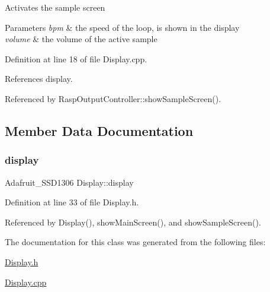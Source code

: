 Activates the sample screen 
\begin{DoxyParams}{Parameters}
{\em bpm} & the speed of the loop, is shown in the display \\
\hline
{\em volume} & the volume of the active sample \\
\hline
\end{DoxyParams}


Definition at line 18 of file Display.\+cpp.



References display.



Referenced by Rasp\+Output\+Controller\+::show\+Sample\+Screen().



\subsection{Member Data Documentation}
\mbox{\label{class_display_ad8b8ca65d118eb16461932c6630463a1}} 
\subsubsection{\texorpdfstring{display}{display}}
{\footnotesize\ttfamily Adafruit\+\_\+\+S\+S\+D1306 Display\+::display\hspace{0.3cm}{\ttfamily [private]}}



Definition at line 33 of file Display.\+h.



Referenced by Display(), show\+Main\+Screen(), and show\+Sample\+Screen().



The documentation for this class was generated from the following files\+:\begin{DoxyCompactItemize}
\item 
\hyperlink{_display_8h}{Display.\+h}\item 
\hyperlink{_display_8cpp}{Display.\+cpp}\end{DoxyCompactItemize}
